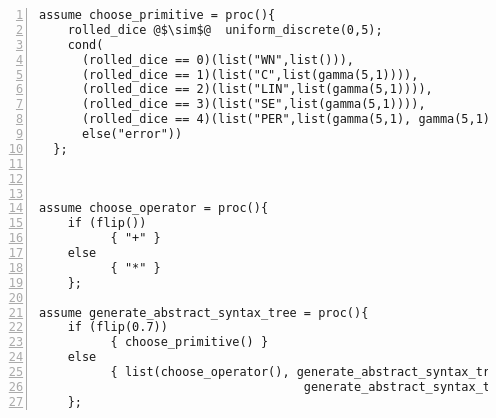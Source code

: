 \begin{mdframed}
\begin{minipage}{\linewidth}
\small
\belowcaptionskip=-10pt
\begin{lstlisting}[mathescape,label=alg:grammar,basicstyle=\selectfont\ttfamily,numbers=left,caption={
Stochastic Grammar},escapechar=\@]
assume choose_primitive = proc(){
    rolled_dice @$\sim$@  uniform_discrete(0,5);
    cond(
      (rolled_dice == 0)(list("WN",list())),
      (rolled_dice == 1)(list("C",list(gamma(5,1)))),
      (rolled_dice == 2)(list("LIN",list(gamma(5,1)))),
      (rolled_dice == 3)(list("SE",list(gamma(5,1)))),
      (rolled_dice == 4)(list("PER",list(gamma(5,1), gamma(5,1)))),
      else("error"))
  };



assume choose_operator = proc(){
    if (flip())
          { "+" }
    else
          { "*" }
    };

assume generate_abstract_syntax_tree = proc(){
    if (flip(0.7))
          { choose_primitive() }
    else
          { list(choose_operator(), generate_abstract_syntax_tree(),
                                     generate_abstract_syntax_tree())}
    };

\end{lstlisting}
\end{minipage}
\end{mdframed}
